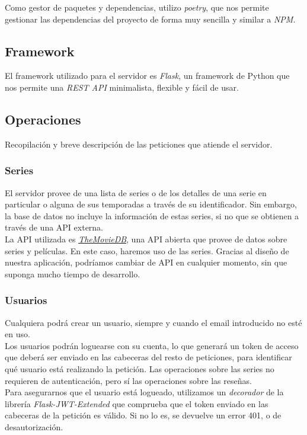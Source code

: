 Como gestor de paquetes y dependencias, utilizo \textit{poetry}\cite{poetry}, que nos permite gestionar las dependencias
del proyecto de forma muy sencilla y similar a \textit{NPM}\cite{npm}.

\subsection{Framework}
El framework utilizado para el servidor es \textit{Flask}\cite{flask}, un framework de Python que nos permite una 
\textit{REST API}\cite{rest} minimalista, flexible y fácil de usar.

\subsection{Operaciones}
Recopilación y breve descripción de las peticiones que atiende el servidor.

\subsubsection{Series}
El servidor provee de una lista de series o de los detalles de una serie en particular o alguna de sus temporadas a
través de su identificador. Sin embargo, la base de datos no incluye la información de estas series, si no que se
obtienen a través de una API externa.\\

La API utilizada es \href{https://www.themoviedb.org}{\textit{TheMovieDB}}, una API abierta que provee de datos sobre
series y películas. En este caso, haremos uso de las series. Gracias al diseño de nuestra aplicación, podríamos cambiar
de API en cualquier momento, sin que suponga mucho tiempo de desarrollo.

\subsubsection{Usuarios}
Cualquiera podrá crear un usuario, siempre y cuando el email introducido no esté en uso.\\

Los usuarios podrán loguearse con su cuenta, lo que generará un token de acceso que deberá ser enviado en las cabeceras
del resto de peticiones, para identificar qué usuario está realizando la petición. Las operaciones sobre las series no
requieren de autenticación, pero sí las operaciones sobre las reseñas.\\

Para asegurarnos que el usuario está logueado, utilizamos un \textit{decorador} de la librería
\textit{Flask-JWT-Extended}\cite{jwt} que comprueba que el token enviado en las cabeceras de la petición es válido. Si
no lo es, se devuelve un error 401, o de desautorización.\\

